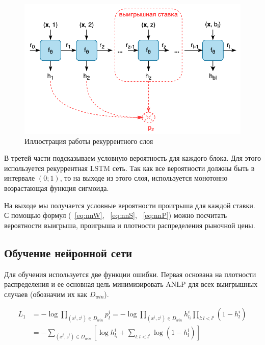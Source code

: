 \documentclass[times,specification,annotation]{itmo-student-thesis}
\begin{document}
\begin{figure}[h]
    \caption{Иллюстрация работы рекуррентного слоя}
    \centering
    \includegraphics{nn_rnn_layer.png}
\end{figure}

В третей части подсказываем условную вероятность для каждого блока. 
Для этого используется рекуррентная LSTM сеть. 
Так как все вероятности должны быть в интервале $(0;1)$, то на выходе из этого слоя, используется монотонно возрастающая функция сигмоида.

На выходе мы получается условные вероятности проигрыша для каждой ставки.
С помощью формул (~\ref{eq:nnW}, ~\ref{eq:nnS}, ~\ref{eq:nnP}) можно посчитать вероятности выигрыша, проигрыша и плотности распределения рыночной цены.

\subsection{Обучение нейронной сети}

Для обучения используется две функции ошибки. 
Первая основана на плотности распределения и ее основная цель минимизировать ANLP для всех выигрышных случаев (обозначим их как $D_{win}$).

\begin{equation}
    \begin{split}
        L_1 & = - \log \prod_{(x^i, z^i) \in D_{win}} p_l^i = - \log \prod_{(x^i, z^i) \in D_{win}} h_{l_i}^i \prod_{l: l < l^i} (1 - h_l^i) \\
        & = - \sum_{(x^i, z^i) \in D_{win}} \left[\log h_{l_i}^i + \sum_{l: l < l^i} \log (1 - h_l^i)\right]
    \end{split}
\end{equation}
\end{document}
